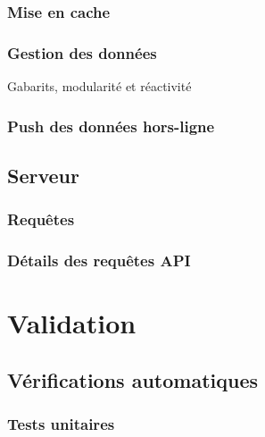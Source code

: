 \documentclass{EPL-master-thesis-covers-FR}
\begin{document}

			\subsection*{Mise en cache}
				\label{sec:cache_client}

			
			\subsection*{Gestion des données}
				Gabarits, modularité et réactivité

			\subsection*{Push des données hors-ligne}
				\label{sec:service_worker}
				
				

			

		\section{Serveur}
			\label{sec:serveur}

		

			\subsection*{Requêtes}

			

			\subsection*{Détails des requêtes API}
				\label{sec:api}

			

	\chapter{Validation}


		\section{Vérifications automatiques}

			\subsection*{Tests unitaires}

			
\end{document}
